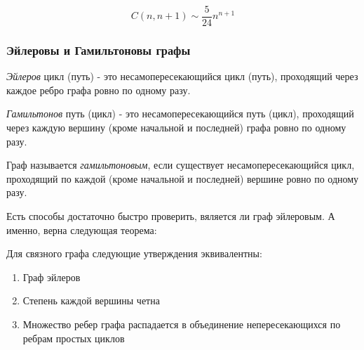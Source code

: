 \begin{theorem}[б/д]
	$$C(n, n+1) \sim \frac{5}{24}n^{n+1}$$
\end{theorem}


\subsubsection{Эйлеровы и Гамильтоновы графы}

\begin{Def}
	\emph{Эйлеров} цикл (путь) - это несамопересекающийся цикл (путь), проходящий через каждое ребро графа ровно по одному разу.
\end{Def}

\begin{Def}
	\emph{Гамильтонов} путь (цикл) - это несамопересекающийся путь (цикл), проходящий через каждую вершину (кроме начальной и последней) графа ровно по одному разу.
\end{Def}

\begin{Def}
	Граф называется \emph{гамильтоновым}, если существует несамопересекающийся цикл, проходящий по каждой (кроме начальной и последней) вершине ровно по одному разу.
\end{Def}

Есть способы достаточно быстро проверить, вяляется ли граф эйлеровым. А именно, верна следующая теорема:

\begin{theorem}
	Для связного графа следующие утверждения эквивалентны:
	\begin{enumerate}
		\item Граф эйлеров
		\item Степень каждой вершины четна
		\item Множество ребер графа распадается в объединение непересекающихся по ребрам простых циклов
	\end{enumerate}
\end{theorem}


